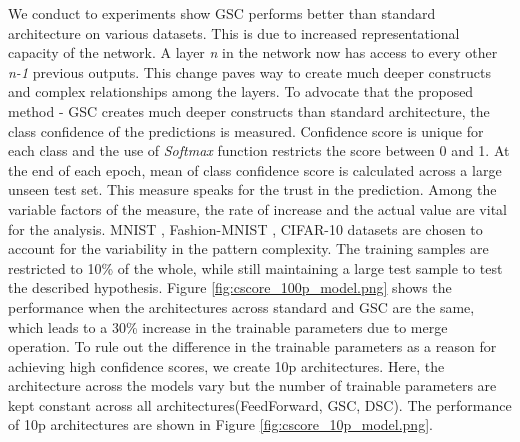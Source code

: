 \documentclass{article}
\begin{document}
We conduct to experiments show GSC performs better than standard architecture on various datasets. This is due to increased representational capacity of the network. A layer \emph{n} in the network now has access to every other \emph{n-1} previous outputs. This change paves way to create much deeper constructs and complex relationships among the layers. To advocate that the proposed method - GSC creates much deeper constructs than standard architecture, the class confidence of the predictions is measured. Confidence score is unique for each class and the use of \emph{Softmax} function restricts the score between 0 and 1. At the end of each epoch, mean of class confidence score is calculated across a large unseen test set. This measure speaks for the trust in the prediction. Among the variable factors of the measure, the rate of increase and the actual value are vital for the analysis. MNIST \cite{LeCun1998GradientbasedLA}, Fashion-MNIST \cite{Xiao2017FashionMNISTAN}, CIFAR-10 datasets \cite{Krizhevsky2009LearningML} are chosen to account for the variability in the pattern complexity. The training samples are restricted to 10\% of the whole, while still maintaining a large test sample to test the described hypothesis. Figure \ref{fig:cscore_100p_model.png} shows the performance when the architectures across standard and GSC are the same, which leads to a 30\% increase in the trainable parameters due to merge operation. To rule out the difference in the trainable parameters as a reason for achieving high confidence scores, we create 10p architectures. Here, the architecture across the models vary but the number of trainable parameters are kept constant across all architectures(FeedForward, GSC, DSC). The performance of 10p architectures are shown in Figure \ref{fig:cscore_10p_model.png}.  
\end{document}

